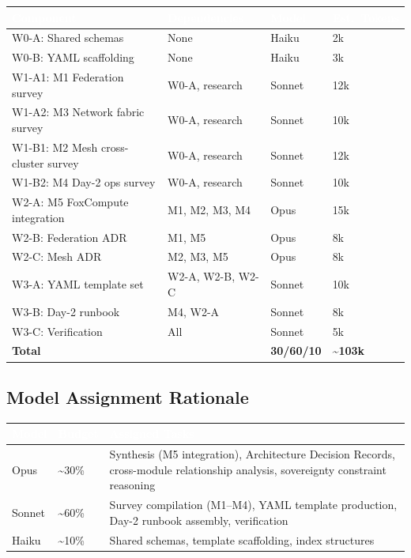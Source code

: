 \documentclass[11pt,letterpaper]{article}
\newcommand{\tableheader}[1]{\textbf{\sffamily\textcolor{white}{#1}}}
\begin{document}
\begin{center}
\begin{tabularx}{\textwidth}{L{3cm}L{2.5cm}C{1.8cm}C{1.8cm}}
\toprule
{}
\tableheader{Component} & \tableheader{Dependencies} & \tableheader{Model} & \tableheader{Est.\ Tokens} \\
\midrule
W0-A: Shared schemas & None & Haiku & 2k \\
W0-B: YAML scaffolding & None & Haiku & 3k \\
W1-A1: M1 Federation survey & W0-A, research & Sonnet & 12k \\
W1-A2: M3 Network fabric survey & W0-A, research & Sonnet & 10k \\
W1-B1: M2 Mesh cross-cluster survey & W0-A, research & Sonnet & 12k \\
W1-B2: M4 Day-2 ops survey & W0-A, research & Sonnet & 10k \\
W2-A: M5 FoxCompute integration & M1, M2, M3, M4 & Opus & 15k \\
W2-B: Federation ADR & M1, M5 & Opus & 8k \\
W2-C: Mesh ADR & M2, M3, M5 & Opus & 8k \\
W3-A: YAML template set & W2-A, W2-B, W2-C & Sonnet & 10k \\
W3-B: Day-2 runbook & M4, W2-A & Sonnet & 8k \\
W3-C: Verification & All & Sonnet & 5k \\
\midrule
{}
\textbf{Total} & & \textbf{30/60/10} & \textbf{\textasciitilde103k} \\
\bottomrule
\end{tabularx}
\end{center}

\subsection{Model Assignment Rationale}

\begin{center}
\begin{tabularx}{\textwidth}{L{2cm}C{1.5cm}X}
\toprule
{}
\tableheader{Model} & \tableheader{Budget} & \tableheader{Assigned Tasks} \\
\midrule
Opus & \textasciitilde30\% & Synthesis (M5 integration), Architecture Decision Records, cross-module relationship analysis, sovereignty constraint reasoning \\
Sonnet & \textasciitilde60\% & Survey compilation (M1--M4), YAML template production, Day-2 runbook assembly, verification \\
Haiku & \textasciitilde10\% & Shared schemas, template scaffolding, index structures \\
\bottomrule
\end{tabularx}
\end{center}
\end{document}
